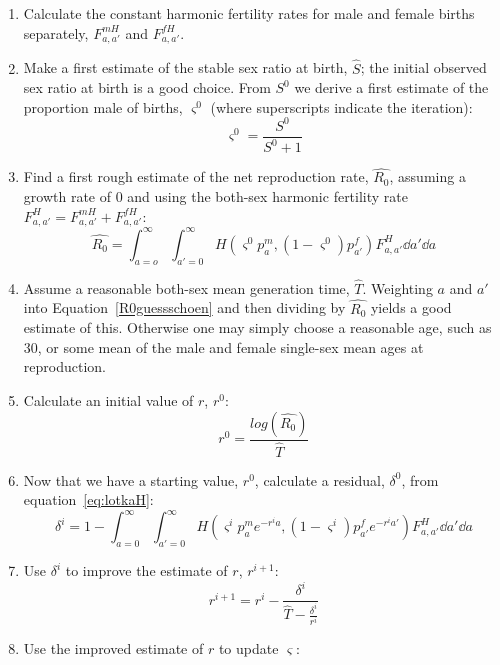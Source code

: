 \begin{enumerate}
  \item Calculate the constant harmonic fertility rates for male and female
  births separately, $F_{a,a'}^{mH}$ and $F_{a,a'}^{fH}$.
  \item Make a first estimate of the stable sex ratio at birth, $\hat{S}$; the
  initial observed sex ratio at birth is a good choice. From $S^0$ we derive a
  first estimate of the proportion male of births, $\varsigma^0$ (where
  superscripts indicate the iteration):
  \begin{equation}
  \varsigma^0 = \frac{S^0}{S^0+1}
  \end{equation}
  \item Find a first rough estimate of the net reproduction rate,
  $\widehat{R_0}$, assuming a growth rate of 0 and using the both-sex
  harmonic fertility rate $F_{a,a'}^{H} = F_{a,a'}^{mH} + F_{a,a'}^{fH}$:
  \begin{equation}
  \label{R0guessschoen}
  \widehat{R_0} = \int_{a=o}^\infty \int_{a'=0}^\infty H(\varsigma^0 p_a^m,
  (1-\varsigma^0)p_{a'}^f) F_{a,a'}^{H} \dd a' \dd a
  \end{equation}
  \item Assume a reasonable both-sex mean generation time, $\widehat{T}$.
  Weighting $a$ and $a'$ into Equation~\eqref{R0guessschoen} and then dividing
  by $\widehat{R_0}$ yields a good estimate of this. Otherwise one may simply
  choose a reasonable age, such as 30, or some mean of the male and female
  single-sex mean ages at reproduction.
  \item Calculate an initial value of $r$, $r^0$:
  \begin{equation}
  r^0 = \frac{log(\widehat{R_0})}{\widehat{T}}
  \end{equation}
  \item Now that we have a starting value, $r^0$, calculate a residual,
  $\delta^0$, from equation~\eqref{eq:lotkaH}:
  \begin{equation}
  \delta^i = 1 - \int _{a=0}^\infty \int _{a'=0}^\infty H(\varsigma^i p_a^m
  e^{-r^ia}, (1-\varsigma^i)p_{a'}^fe^{-r^ia'}) F_{a,a'}^H \dd a' \dd a
  \end{equation}
  \item Use $\delta^i$ to improve the estimate of $r$, $r^{i+1}$:
  \begin{equation}
  r^{i+1} = r^i - \frac{\delta^i}{\widehat{T} - \frac{\delta^i}{r^i}}
  \end{equation}
  \item Use the improved estimate of $r$ to update $\varsigma$:

\end{enumerate}
